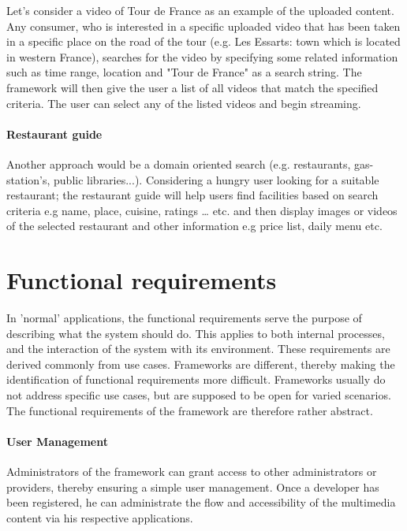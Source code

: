 Let's consider a video of Tour de France as an example of the uploaded content. Any consumer, who is interested in a specific uploaded video that has been taken in a specific place on the road of the tour (e.g. Les Essarts: town which is located in western France), searches for the video by specifying some related information such as time range, location and "Tour de France" as a search string. The framework will then give the user a list of all videos that match the specified criteria. The user can select any of the listed videos and begin streaming.

\paragraph{Restaurant guide}

Another approach would be a domain oriented search (e.g. restaurants, gas-station's, public libraries...). Considering a hungry user looking for a suitable restaurant; the restaurant guide will help users find facilities based on search criteria e.g name, place, cuisine, ratings … etc. and then display images or videos of the selected restaurant and other information e.g price list, daily menu etc.

\section{Functional requirements\label{sec:req_f_req}}

In 'normal' applications, the functional requirements serve the purpose of describing what the system should do. This applies to both internal processes, and the interaction of the system with its environment. These requirements are derived commonly from use cases. Frameworks are different, thereby making the identification of functional requirements more difficult. Frameworks usually do not address specific use cases, but are supposed to be open for varied scenarios. The functional requirements of the framework are therefore rather abstract.

\paragraph{User Management}
Administrators of the framework can grant access to other administrators or providers, thereby ensuring a simple user management. Once a developer has been registered, he can administrate the flow and accessibility of the multimedia content via his respective applications.

